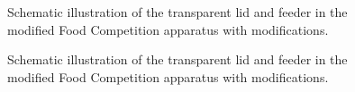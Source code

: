 \documentclass[english, a4paper, 11pt]{article}
\begin{document}
\begin{figure}[h]
    \centering
    \caption{Schematic illustration of the transparent lid and feeder in the modified Food Competition apparatus with modifications.}
    \label{fig:modified_apparatus_feeder}
\end{figure}
\begin{figure}[h]
    \centering
    \caption{Schematic illustration of the transparent lid and feeder in the modified Food Competition apparatus with modifications.}
    \label{fig:modified_apparatus_homecage_reality}
\end{figure}
\end{document}
